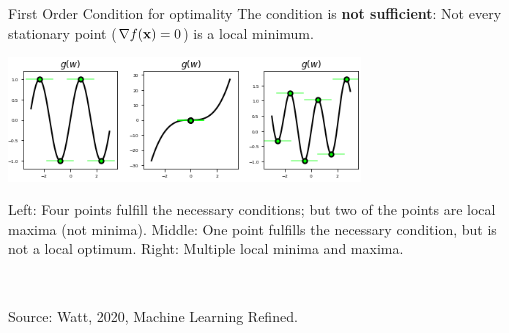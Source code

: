 \begin{vbframe}{First Order Condition for optimality}
  The condition is \textbf{not sufficient}: Not every stationary point ($\nabla f(\mathbf{x}) = 0$) is a local minimum. 
  
  \begin{center}
  \includegraphics[width = 0.7\textwidth]{figure_man/saddle_points_2.png} \\
  \begin{footnotesize}
  Left: Four points fulfill the necessary conditions; but two of the points are local maxima (not minima). Middle: One point fulfills the necessary condition, but is not a local optimum. Right: Multiple local minima and maxima. 
  \end{footnotesize}\\
  \begin{tiny}
  Source: Watt, 2020, Machine Learning Refined. 
  \end{tiny}
  \end{center}
  
  \end{vbframe}
  

